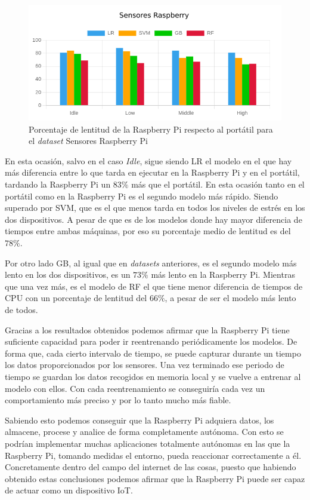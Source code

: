 \documentclass[a4paper, 12pt]{book}
\begin{document}
\begin{figure}[htb]
  \centering
  \includegraphics[width=14cm, keepaspectratio]{img/per_mi.png}
  \caption{Porcentaje de lentitud de la Raspberry Pi respecto al portátil para el \textit{dataset} Sensores Raspberry Pi}
  \label{fig:per_Mi}
\end{figure}

En esta ocasión, salvo en el caso \textit{Idle}, sigue siendo LR el modelo en el que hay más diferencia entre lo que tarda en ejecutar en la Raspberry Pi y en el portátil, tardando la Raspberry Pi un $83\%$ más que el portátil. En esta ocasión tanto en el portátil como en la Raspberry Pi es el segundo modelo más rápido. Siendo superado por SVM, que es el que menos tarda en todos los niveles de estrés en los dos dispositivos. A pesar de que es de los modelos donde hay mayor diferencia de tiempos entre ambas máquinas, por eso su porcentaje medio de lentitud es del $78\%$.

Por otro lado GB, al igual que en \textit{datasets} anteriores, es el segundo modelo más lento en los dos dispositivos, es un $73\%$ más lento en la Raspberry Pi. Mientras que una vez más, es el modelo de RF el que tiene menor diferencia de tiempos de CPU con un porcentaje de lentitud del $66\%$, a pesar de ser el modelo más lento de todos.

Gracias a los resultados obtenidos podemos afirmar que la Raspberry Pi tiene suficiente capacidad para poder ir reentrenando periódicamente los modelos. De forma que, cada cierto intervalo de tiempo, se puede capturar durante un tiempo los datos proporcionados por los sensores. Una vez terminado ese periodo de tiempo se guardan los datos recogidos en memoria local y se vuelve a entrenar al modelo con ellos. Con cada reentrenamiento se conseguiría cada vez un comportamiento más preciso y por lo tanto mucho más fiable.

Sabiendo esto podemos conseguir que la Raspberry Pi adquiera datos, los almacene, procese y analice de forma completamente autónoma. Con esto se podrían implementar muchas aplicaciones totalmente autónomas en las que la Raspberry Pi, tomando medidas el entorno, pueda reaccionar correctamente a él. Concretamente dentro del campo del internet de las cosas, puesto que habiendo obtenido estas conclusiones podemos afirmar que la Raspberry Pi puede ser capaz de actuar como un dispositivo IoT.
\end{document}
